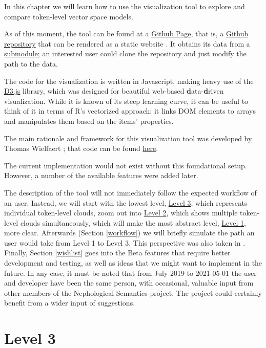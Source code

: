 \documentclass[
]{book}
\begin{document}
In this chapter we will learn how to use the visualization tool to explore
and compare token-level vector space models.

As of this moment, the tool can be found at a
\href{https://qlvl.github.io/NephoVis}{Github Page}, that is,
a \href{https://github.com/qlvl/NephoVis}{Github repository} that can be rendered
as a static website \autocite{montes.qlvl_2021}.
It obtains its data from a \href{https://github.com/qlvl/tokenclouds}{submodule};
an interested user could clone the repository and just modify the path to the data.

The code for the visualization is written in Javascript, making heavy use of the
\href{https://d3.js}{D3.js} library, which was designed for beautiful web-based
\textbf{d}ata-\textbf{d}riven visualization. While it is known of its steep learning curve,
it can be useful to think of it in terms of R's vectorized approach: it links
DOM elements to arrays and manipulates them based on the items' properties.

The main rationale and framework for this visualization tool was developed by
Thomas Wielfaert \autocite{wielfaert.etal_2019}; that code can be found
\href{https://github.com/tokenclouds/tokenclouds.github.io/LeTok/}{here}.

The current implementation would not exist without this foundational setup. However,
a number of the available features were added later.

The description of the tool will not immediately follow the expected workflow of an user.
Instead, we will start with the lowest level, \protect\hyperlink{level_3}{Level 3},
which represents individual token-level clouds,
zoom out into \protect\hyperlink{level_2}{Level 2}, which shows multiple token-level clouds simultaneously,
which will make the most abstract level, \protect\hyperlink{level_1}{Level 1}, more clear.
Afterwards (Section \ref{workflow}) we will briefly simulate the path an user would take from Level 1 to Level 3.
This perspective was also taken in \textcite{montes.heylen_Submitted}.
Finally, Section \ref{wishlist} goes into the Beta features
that require better development and testing, as well as ideas that we might want to
implement in the future. In any case, it must be noted that from July 2019 to
2021-05-01 the user and developer have been the same person, with occasional,
valuable input from other members of the Nephological Semantics project. The
project could certainly benefit from a wider input of suggestions.

\hypertarget{level_3}{%
\section{Level 3}\label{level_3}}
\end{document}
